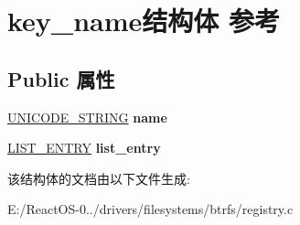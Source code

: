 \hypertarget{structkey__name}{}\section{key\+\_\+name结构体 参考}
\label{structkey__name}
\subsection*{Public 属性}
\begin{DoxyCompactItemize}
\item 
\mbox{\label{structkey__name_ac1b6f054366bdcc50ad60c52156c3e76}} 
\hyperlink{struct___u_n_i_c_o_d_e___s_t_r_i_n_g}{U\+N\+I\+C\+O\+D\+E\+\_\+\+S\+T\+R\+I\+NG} {\bfseries name}
\item 
\mbox{\label{structkey__name_aaa995b965c2bdc10c9e0943541f5ca5f}} 
\hyperlink{struct___l_i_s_t___e_n_t_r_y}{L\+I\+S\+T\+\_\+\+E\+N\+T\+RY} {\bfseries list\+\_\+entry}
\end{DoxyCompactItemize}


该结构体的文档由以下文件生成\+:\begin{DoxyCompactItemize}
\item 
E\+:/\+React\+O\+S-\/0../drivers/filesystems/btrfs/registry.\+c\end{DoxyCompactItemize}
